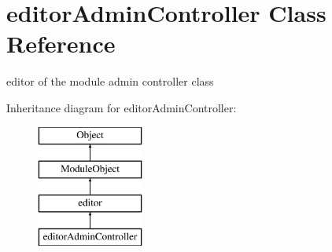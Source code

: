 \hypertarget{classeditorAdminController}{}\section{editor\+Admin\+Controller Class Reference}
\label{classeditorAdminController}


editor of the module admin controller class  


Inheritance diagram for editor\+Admin\+Controller\+:\begin{figure}[H]
\begin{center}
\leavevmode
\includegraphics[height=4.000000cm]{classeditorAdminController}
\end{center}
\end{figure}
